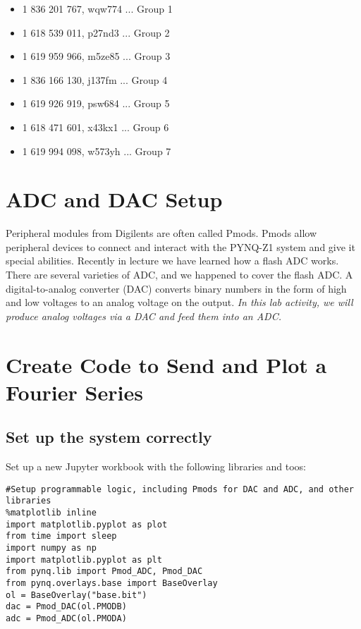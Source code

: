 \documentclass{article}
\begin{document}
\begin{itemize}
\item 1 836 201 767, wqw774 ... Group 1
\item 1 618 539 011, p27nd3 ... Group 2
\item 1 619 959 966, m5ze85 ... Group 3
\item 1 836 166 130, j137fm ... Group 4
\item 1 619 926 919, psw684 ... Group 5
\item 1 618 471 601, x43kx1 ... Group 6
\item 1 619 994 098, w573yh ... Group 7
\end{itemize}

\section{ADC and DAC Setup}

Peripheral modules from Digilents are often called Pmods.  Pmods allow peripheral devices to connect and interact with the PYNQ-Z1 system and give it special abilities.  Recently in lecture we have learned how a flash ADC works.  There are several varieties of ADC, and we happened to cover the flash ADC.  A digital-to-analog converter (DAC) converts binary numbers in the form of high and low voltages to an analog voltage on the output.  \textit{In this lab activity, we will produce analog voltages via a DAC and feed them into an ADC.}

\section{Create Code to Send and Plot a Fourier Series}

\subsection{Set up the system correctly}

Set up a new Jupyter workbook with the following libraries and toos:

\begin{verbatim}
#Setup programmable logic, including Pmods for DAC and ADC, and other libraries
%matplotlib inline
import matplotlib.pyplot as plot
from time import sleep
import numpy as np
import matplotlib.pyplot as plt
from pynq.lib import Pmod_ADC, Pmod_DAC
from pynq.overlays.base import BaseOverlay
ol = BaseOverlay("base.bit")
dac = Pmod_DAC(ol.PMODB)
adc = Pmod_ADC(ol.PMODA)
\end{verbatim}
\end{document}
